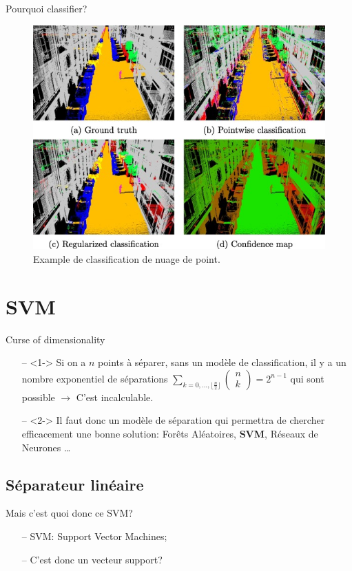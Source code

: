 \documentclass[9pt]{beamer}
\begin{document}
	\begin{frame}{Pourquoi classifier?}
		\begin{figure}[H]
			\includegraphics[width=.7\textwidth]{pc_classification}
			\caption{\label{fig::pc_classif}Example de classification de nuage de point\cite{LANDRIEU2017102}.}
		\end{figure}
	\end{frame}

	\section[SVM]{SVM}
	\begin{frame}{Curse of dimensionality}
		\begin{itemize}
			\item[--]<1-> Si on a $n$ points à séparer, sans un modèle de classification, il y a un nombre exponentiel de séparations $\sum_{k=0,\dots,\lfloor \frac{n}{2} \rfloor} \begin{pmatrix}
			n\\
			k
			\end{pmatrix} = 2^{n-1}$ qui sont possible $\longrightarrow$ C'est incalculable.
			\item[--]<2-> Il faut donc un modèle de séparation qui permettra de chercher efficacement une bonne solution: Forêts Aléatoires, \textbf{SVM}, Réseaux de Neurones \dots
		\end{itemize}
	\end{frame}
	\subsection[linear]{Séparateur linéaire}
	\begin{frame}{Mais c'est quoi donc ce SVM?}
		\begin{itemize}
			\item[--] SVM\@: Support Vector Machines;
			\item[--] C'est donc un vecteur support?
		\end{itemize}
	\end{frame}
\end{document}
